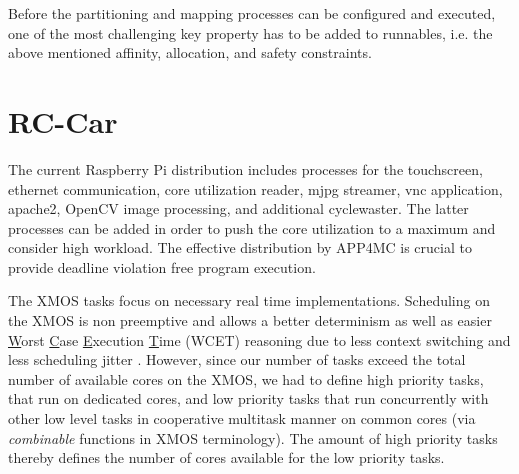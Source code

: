 \documentclass [a4paper,final,conference,10pt]{IDAACS}
\begin{document}


Before the partitioning and mapping processes can be configured and executed, one of the most challenging key property has to be added to runnables, i.e. the above mentioned affinity, allocation, and safety constraints.
\section{RC-Car}
\label{sec:rccar}
The current Raspberry Pi distribution includes processes for the touchscreen, ethernet communication, core utilization reader, mjpg streamer, vnc application, apache2, OpenCV\cite{opencv} image processing, and additional cyclewaster. The latter processes can be added in order to push the core utilization to a maximum and consider high workload. The effective distribution by APP4MC is crucial to provide deadline violation free program execution. 

The XMOS tasks focus on necessary real time implementations. Scheduling on the XMOS is non preemptive and allows a better determinism as well as easier \underline{W}orst \underline{C}ase \underline{E}xecution \underline{T}ime (WCET) reasoning due to less context switching and less scheduling jitter \cite{xmos}. However, since our number of tasks exceed the total number of available cores on the XMOS, we had to define high priority tasks, that run on dedicated cores, and low priority tasks that run concurrently with other low level tasks in cooperative multitask manner on common cores (via \textit{combinable} functions in XMOS terminology). The amount of high priority tasks thereby defines the number of cores available for the low priority tasks. 
\end{document}
